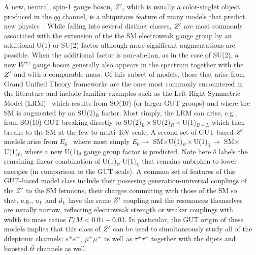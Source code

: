 A new, neutral, spin-1 gauge boson, $Z^{\prime}$, which is usually a color-singlet object produced in the $q\bar q$ channel, is a ubiquitous feature of many models that predict new 
physics~\cite{Langacker:2008yv,Rizzo:2006nw,Carena:2004xs,Salvioni:2009mt}.  While falling into several distinct classes, $Z^{\prime}$ are most commonly associated with the 
extension of the the SM electroweak gauge group by an additional U(1) or SU(2) factor although more significant augmentations are possible. When the additional factor is non-abelian, 
as in the case of SU(2), a new $W^\pm$' gauge boson generally also appears in the spectrum together with the $Z^{\prime}$ and with a comparable mass.  Of this subset of models, those 
that arise from Grand Unified Theory frameworks are the ones most commonly encountered in the literature and include familiar examples such as the Left-Right Symmetric 
Model (LRM)~\cite{Senjanovic:1975rk,Senjanovic:1975rk,Mohapatra:1980yp} which results from SO(10) 
(or larger GUT groups) and where the SM is augmented by an SU(2)$_R$ factor. Most simply, the LRM can arise, e.g., from SO(10) GUT breaking directly to 
SU(2)$_L \times$SU(2)$_R \times$U(1)$_{B-L}$ which then breaks to the SM at the few to multi-TeV scale. A second set of GUT-based $Z^{\prime}$ models arise from 
$E_6$~\cite{Robinett:1982tq,London:1986dk,Hewett:1988xc,Joglekar:2016yap} where most simply $E_6 \rightarrow$ SM$\times$U(1)$_\psi \times$U(1)$_\chi \rightarrow $ SM$
\times$U(1)$_\theta$, where a new U(1)$_\theta$ gauge group factor is predicted. Note here $\theta$ labels the remaining linear combination of U(1)$_\psi$-U(1)$_\chi$ that remains 
unbroken to lower energies (in comparison to the GUT scale).  A common set of features of this GUT-based model class include their possesing generation-universal couplings 
of the $Z^{\prime}$ to the SM fermions, their charges commuting with those of the SM so that, e.g., $u_L$ and $d_L$ have the same $Z^{\prime}$ coupling and the resonances themselves are usually 
narrow, reflecting electroweak strength or weaker couplings with width to mass ratios $\Gamma/M < 0.01-0.03$. In particular, the GUT origin of these models 
implies that this class of $Z^{\prime}$ can be used to simultaneously study all of the dileptonic channels: $e^+e^-,~\mu^+\mu^+$ as well as $\tau^+\tau^-$ together with the dijets and boosted 
$t\bar t$ channels as well.

